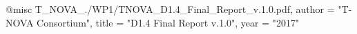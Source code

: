 @misc{ T_NOVA_./WP1/TNOVA_D1.4_Final_Report_v.1.0.pdf,
       author = "{T-NOVA Consortium}",
       title = "D1.4 Final Report v.1.0",
       year = "2017" }
